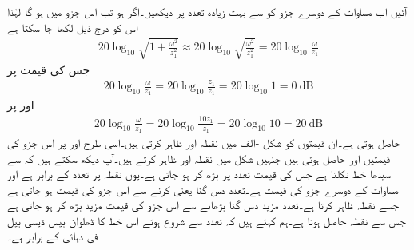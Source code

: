 آئیں اب مساوات  کے دوسرے جزو  کو  سے بہت زیادہ تعدد پر دیکھیں۔اگر  ہو تب اس جزو میں  ہو گا لہٰذا اس کو درج ذیل لکھا جا سکتا ہے
\begin{align*}
20\log_{10}\sqrt{1+\frac{\omega^2}{z_1^2}}\approx 20\log_{10}\sqrt{\frac{\omega^2}{z_1^2}}=20\log_{10}\frac{\omega}{z_1}
\end{align*}
جس کی قیمت  پر
\begin{align*}
20\log_{10}\frac{\omega}{z_1}=20\log_{10}\frac{z_1}{z_1}=20\log_{10}1=\SI{0}{\deci\bel}
\end{align*}
اور  پر 
\begin{align*}
20\log_{10}\frac{\omega}{z_1}=20\log_{10}\frac{10 z_1}{z_1}=20\log_{10}10=\SI{20}{\deci\bel}
\end{align*}
حاصل ہوتی ہے۔ان قیمتوں کو شکل -الف میں نقطہ  اور   ظاہر کرتی ہیں۔اسی طرح  اور  پر اس جزو کی قیمتیں  اور  حاصل ہوتی ہیں جنہیں شکل میں نقطہ  اور  ظاہر کرتے ہیں۔آپ دیکھ سکتے ہیں کہ  سے  سیدھا خط نکلتا ہے جس  کی قیمت  تعدد پر بڑھ کر  ہو جاتی ہے۔یوں نقطہ  پر تعدد  کے برابر ہے اور مساوات  کے دوسرے جزو کی قیمت  ہے۔تعدد دس گنا یعنی  کرنے سے  اس جزو کی قیمت  ہو جاتی ہے  جسے نقطہ  ظاہر کرتا ہے۔تعدد مزید دس گنا بڑھانے  سے  اس جزو کی قیمت مزید  بڑھ کر  ہو جاتی ہے جس سے نقطہ  حاصل ہوتا ہے۔ہم کہتے ہیں کہ  تعدد سے شروع ہوتے اس خط کا ڈھلوان بیس ڈیسی بیل فی دہائی کے برابر ہے۔
%
